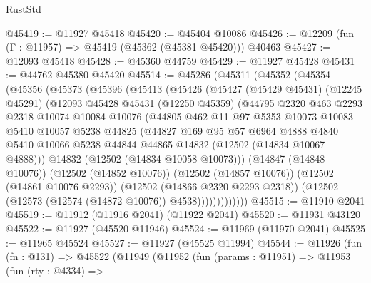 \begin{lexlean}{RustStd}
\begin{coremodule}
@45419 := @11927 @45418
@45420 := @45404 @10086
@45426 := @12209 (fun (Γ : @11957) => @45419 (@45362 (@45381 @45420))) @40463
@45427 := @12093 @45418
@45428 := @45360 @44759
@45429 := @11927 @45428
@45431 := @44762 @45380 @45420
@45514 := @45286
    (@45311
      (@45352
        (@45354
          (@45356
            (@45373
              (@45396
                (@45413
                  (@45426
                    (@45427
                      (@45429 @45431)
                      (@12245 @45291)
                      (@12093
                        @45428
                        @45431
                        (@12250 @45359)
                        (@44795
                          @2320
                          @463
                          @2293
                          @2318
                          @10074
                          @10084
                          @10076
                          (@44805
                            @462
                            @11
                            @97
                            @5353
                            @10073
                            @10083
                            @5410
                            @10057
                            @5238
                            @44825
                            (@44827
                              @169
                              @95
                              @57
                              @6964
                              @4888
                              @4840
                              @5410
                              @10066
                              @5238
                              @44844
                              @44865
                              @14832
                              (@12502 (@14834 @10067 @4888)))
                            @14832
                            (@12502 (@14834 @10058 @10073)))
                          (@14847 (@14848 @10076))
                          (@12502 (@14852 @10076))
                          (@12502 (@14857 @10076))
                          (@12502 (@14861 @10076 @2293))
                          (@12502 (@14866 @2320 @2293 @2318))
                          (@12502 (@12573 (@12574 (@14872 @10076)) @4538)))))))))))))
@45515 := @11910 @2041
@45519 := @11912 (@11916 @2041) (@11922 @2041)
@45520 := @11931 @43120
@45522 := @11927 (@45520 @11946)
@45524 := @11969 (@11970 @2041)
@45525 := @11965 @45524
@45527 := @11927 (@45525 @11994)
@45544 := @11926
    (fun (fn : @131) =>
    @45522
      (@11949
        (@11952
          (fun (params : @11951) =>
          @11953
            (fun (rty : @4334) =>

\end{coremodule}
\end{lexlean}
